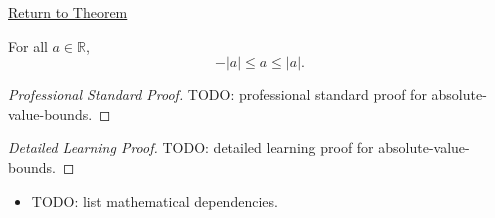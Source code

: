 \newpage
{}
\label{prf:absolute-value-bounds}

\begin{remark*}[Return]
\hyperref[thm:absolute-value-bounds]{Return to Theorem}
\end{remark*}

\begin{theorem*}
For all $a \in \mathbb{R}$,
\[
  -\lvert a \rvert \le a \le \lvert a \rvert.
\]
\end{theorem*}

\begin{proof}[Professional Standard Proof]
\LRAProofBodyStart
TODO: professional standard proof for absolute-value-bounds.
\end{proof}

\begin{proof}[Detailed Learning Proof]
\LRAProofBodyStart
TODO: detailed learning proof for absolute-value-bounds.
\end{proof}

\begin{remark*}
\end{remark*}

\begin{dependencies}
\begin{itemize}
  \item TODO: list mathematical dependencies.
\end{itemize}
\end{dependencies}

\clearpage
